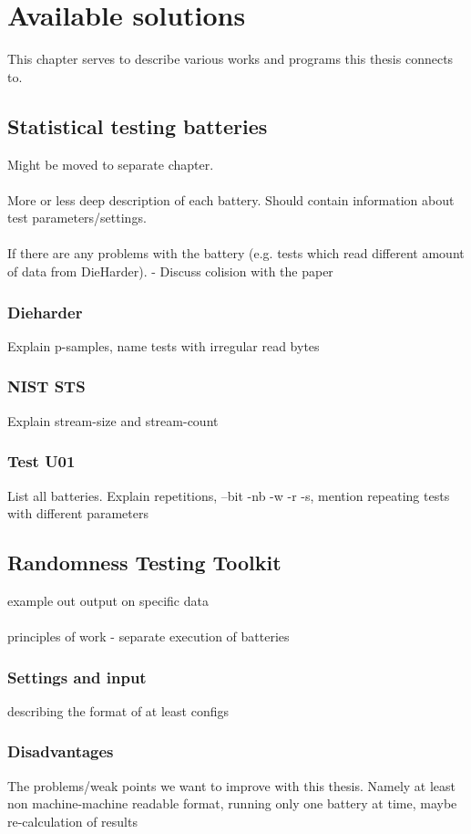 \documentclass[
  digital,     %
  oneside,     %
  nosansbold,  %
  nocolorbold, %
  nolof,         %
  nolot,         %
]{fithesis4}
\begin{document}
\chapter{Available solutions}


This chapter serves to describe various works and programs this thesis connects to. 

\section{Statistical testing batteries}
Might be moved to separate chapter.\\
\\
More or less deep description of each battery. Should contain information about test parameters/settings.\\
\\
If there are any problems with the battery (e.g. tests which read different amount of data from DieHarder). - Discuss colision with the paper
\subsection{Dieharder}
Explain p-samples, name tests with irregular read bytes
\subsection{NIST STS}
Explain stream-size and stream-count

\subsection{Test U01}
List all batteries.
Explain repetitions, --bit -nb -w -r -s, mention repeating tests with different parameters


\section{Randomness Testing Toolkit}

example out output on specific data\\
\\
principles of work - separate execution of batteries

\subsection{Settings and input}
describing the format of at least configs

\subsection{Disadvantages}
The problems/weak points we want to improve with this thesis. Namely at least non machine-machine readable format, running only one battery at time, maybe re-calculation of results
\end{document}
